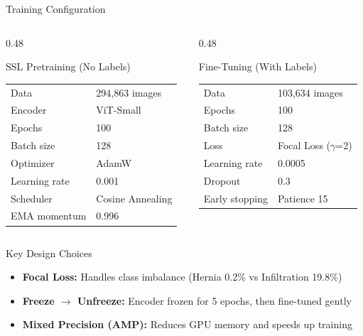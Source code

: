 \documentclass{beamer}
\begin{document}
\begin{frame}{Training Configuration}
\begin{columns}[T]
\begin{column}{0.48\textwidth}
\begin{block}{SSL Pretraining (No Labels)}
\small
\begin{tabular}{@{}ll@{}}
\toprule
Data & 294,863 images \\
Encoder & ViT-Small \\
Epochs & 100 \\
Batch size & 128 \\
Optimizer & AdamW \\
Learning rate & 0.001 \\
Scheduler & Cosine Annealing \\
EMA momentum & 0.996 \\
\bottomrule
\end{tabular}
\end{block}
\end{column}
\begin{column}{0.48\textwidth}
\begin{block}{Fine-Tuning (With Labels)}
\small
\begin{tabular}{@{}ll@{}}
\toprule
Data & 103,634 images \\
Epochs & 100 \\
Batch size & 128 \\
Loss & Focal Loss ($\gamma$=2) \\
Learning rate & 0.0005 \\
Dropout & 0.3 \\
Early stopping & Patience 15 \\
\bottomrule
\end{tabular}
\end{block}
\end{column}
\end{columns}
\vspace{6pt}
\begin{block}{Key Design Choices}
\begin{itemize}
    \item \textbf{Focal Loss:} Handles class imbalance (Hernia 0.2\% vs Infiltration 19.8\%)
    \item \textbf{Freeze $\rightarrow$ Unfreeze:} Encoder frozen for 5 epochs, then fine-tuned gently
    \item \textbf{Mixed Precision (AMP):} Reduces GPU memory and speeds up training
\end{itemize}
\end{block}
\end{frame}
\end{document}
